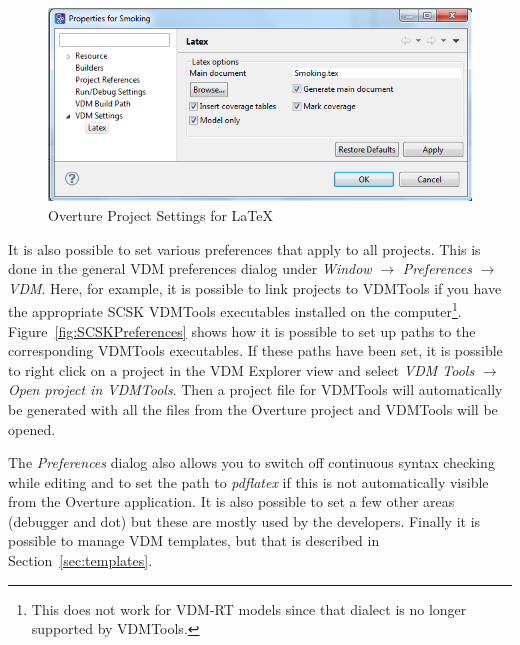 \documentclass{overturerepchap}
\begin{document}
\begin{figure}[!hbt]
\begin{center}
  \includegraphics[width=\textwidth]{screenDumps/projectsettingslatex}
  \caption[Overture Project Settings]{Overture Project Settings for \LaTeX}
  \label{fig:VDMSettingsLatex}
\end{center}
\end{figure}

It is also possible to set various preferences that apply to
all projects. This is done in the general VDM preferences dialog under
\emph{Window} $\rightarrow$ \emph{Preferences} $\rightarrow$
\emph{VDM}. Here, for example, it is possible to link projects to
VDMTools if you have the appropriate SCSK VDMTools executables installed on
the computer\footnote{This does not work for VDM-RT models since that dialect is no longer supported by VDMTools.}. Figure~\ref{fig:SCSKPreferences} shows how it is possible to
set up paths to the corresponding VDMTools executables. If these paths have
been set, it is possible to right click on a project in the VDM
Explorer view and select \emph{VDM Tools} $\rightarrow$
\emph{Open project in VDMTools}. Then a project file for VDMTools
will automatically be generated with all the files from the Overture project
and VDMTools will be opened. 

The \emph{Preferences} dialog also
allows you to switch off continuous syntax checking while editing and
to set the path to \emph{pdflatex} if this is not automatically
visible from the Overture application. It is also possible to set a few
other areas (debugger and dot) but these are mostly used by the developers.
Finally it is possible to
manage VDM templates, but that is described in Section~\ref{sec:templates}.
\end{document}

